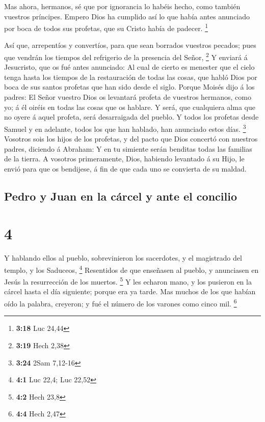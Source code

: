  Mas ahora, hermanos, sé que por ignorancia lo habéis
hecho, como también vuestros príncipes.  Empero Dios ha
cumplido así lo que había antes anunciado por boca de todos sus
profetas, que su Cristo había de padecer. \footnote{\textbf{3:18} Luc
  24,44}

 Así que, arrepentíos y convertíos, para que sean
borrados vuestros pecados; pues que vendrán los tiempos del refrigerio
de la presencia del Señor, \footnote{\textbf{3:19} Hech 2,38}
 Y enviará á Jesucristo, que os fué antes anunciado:
 Al cual de cierto es menester que el cielo tenga hasta
los tiempos de la restauración de todas las cosas, que habló Dios por
boca de sus santos profetas que han sido desde el siglo. 
Porque Moisés dijo á los padres: El Señor vuestro Dios os levantará
profeta de vuestros hermanos, como yo; á él oiréis en todas las cosas
que os hablare.  Y será, que cualquiera alma que no oyere
á aquel profeta, será desarraigada del pueblo.  Y todos
los profetas desde Samuel y en adelante, todos los que han hablado, han
anunciado estos días. \footnote{\textbf{3:24} 2Sam 7,12-16}
 Vosotros sois los hijos de los profetas, y del pacto que
Dios concertó con nuestros padres, diciendo á Abraham: Y en tu simiente
serán benditas todas las familias de la tierra.  A
vosotros primeramente, Dios, habiendo levantado á su Hijo, le envió para
que os bendijese, á fin de que cada uno se convierta de su maldad.

\hypertarget{pedro-y-juan-en-la-cuxe1rcel-y-ante-el-concilio}{%
\subsection{Pedro y Juan en la cárcel y ante el
concilio}\label{pedro-y-juan-en-la-cuxe1rcel-y-ante-el-concilio}}

\hypertarget{section-3}{%
\section{4}\label{section-3}}

 Y hablando ellos al pueblo, sobrevinieron los sacerdotes,
y el magistrado del templo, y los Saduceos, \footnote{\textbf{4:1} Luc
  22,4; Luc 22,52}  Resentidos de que enseñasen al pueblo,
y anunciasen en Jesús la resurrección de los muertos. \footnote{\textbf{4:2}
  Hech 23,8}  Y les echaron mano, y los pusieron en la
cárcel hasta el día siguiente; porque era ya tarde.  Mas
muchos de los que habían oído la palabra, creyeron; y fué el número de
los varones como cinco mil. \footnote{\textbf{4:4} Hech 2,47}

